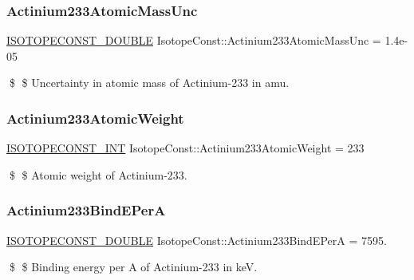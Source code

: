 \subsubsection{\texorpdfstring{Actinium233\+Atomic\+Mass\+Unc}{Actinium233AtomicMassUnc}}
{\footnotesize\ttfamily \mbox{\hyperlink{group___isotope_const-_macros_ga8f45a7272ce02c0b4c65c44636ed719a}{I\+S\+O\+T\+O\+P\+E\+C\+O\+N\+S\+T\+\_\+\+D\+O\+U\+B\+LE}} Isotope\+Const\+::\+Actinium233\+Atomic\+Mass\+Unc = 1.\+4e-\/05}

\$ \$ Uncertainty in atomic mass of Actinium-\/233 in amu. \mbox{\label{group___isotope_const-_actinium-_ac233_ga40e0b4398672bbae84a1a92fd93f1fa0}} 
\subsubsection{\texorpdfstring{Actinium233\+Atomic\+Weight}{Actinium233AtomicWeight}}
{\footnotesize\ttfamily \mbox{\hyperlink{group___isotope_const-_macros_ga5f18360b3e99483a35c32d789e62621c}{I\+S\+O\+T\+O\+P\+E\+C\+O\+N\+S\+T\+\_\+\+I\+NT}} Isotope\+Const\+::\+Actinium233\+Atomic\+Weight = 233}

\$ \$ Atomic weight of Actinium-\/233. \mbox{\label{group___isotope_const-_actinium-_ac233_gaca01ccbccee9298d2989b17c6579e667}} 
\subsubsection{\texorpdfstring{Actinium233\+Bind\+E\+PerA}{Actinium233BindEPerA}}
{\footnotesize\ttfamily \mbox{\hyperlink{group___isotope_const-_macros_ga8f45a7272ce02c0b4c65c44636ed719a}{I\+S\+O\+T\+O\+P\+E\+C\+O\+N\+S\+T\+\_\+\+D\+O\+U\+B\+LE}} Isotope\+Const\+::\+Actinium233\+Bind\+E\+PerA = 7595.}

\$ \$ Binding energy per A of Actinium-\/233 in keV. \mbox{\label{group___isotope_const-_actinium-_ac233_ga86468da6f630c8aa424e798de5f11399}} 
